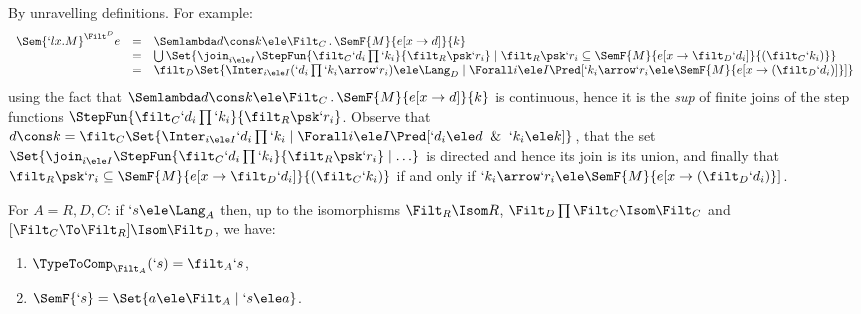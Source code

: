 \documentclass{lmcs}
\begin{document}
 \begin{Proof}
By unravelling definitions. For example:
%
%
 \[ \begin{array}[t]{rcl@{\quad}l}
\Sem{ `l x.M}^{\Filt^D }{ e }
	& = & \Semlambda d\cons k \ele \Filt_C \, . \, \SemF { M }{ e[x\to d] }{ k } \\
	& = & \bigcup \Set{ \join_{i \ele I}\StepFun{\filt_C `d_i\prod `k_i }{ \filt_R\psk `r_i} \mid \filt_R\psk `r_i \subseteq \SemF { M }{ e[x\to \filt_D `d_i] }{ (\filt_C `k_i) } } \\
	& = & \filt_D \Set{ \Inter_{i \ele I}(`d_i\prod `k_i\arrow `r_i) \ele \Lang_D \mid \Forall i \ele I \Pred[{ `k_i\arrow `r_i \ele \SemF { M }{ e[x\to (\filt_D `d_i)] } }] }
	\end{array} \]
using the fact that $ \Semlambda d\cons k \ele \Filt_C \, . \, \SemF { M }{ e[x\to d] }{ k }$ is continuous, hence it is the \emph{sup} of finite joins of the step functions 
$\StepFun{\filt_C `d_i\prod `k_i }{ \filt_R\psk `r_i} $.
Observe that $d\cons k = \filt_C \Set{\Inter_{i \ele I}`d_i\prod `k_i \mid \Forall i \ele I \Pred[ `d_i \ele d \And `k_i \ele k ] }$, that the set $\Set{\join_{i \ele I}\StepFun{\filt_C `d_i\prod `k_i }{ \filt_R\psk `r_i} \mid \ldots}$ is directed and hence its join is its union, and finally that $\filt_R\psk `r_i \subseteq \SemF { M }{ e[x\to \filt_D `d_i] }{ (\filt_C `k_i) }$ if and only if $`k_i\arrow `r_i \ele \SemF { M }{ e[x\to (\filt_D `d_i) } ]$.
 \end{Proof}

 \begin{lem} \label{lem:filtSemTypes}
For $A = R,D,C$: if $`s\ele \Lang_A$ then, up to the isomorphisms $\Filt_R\Isom R$, $\Filt_D\prod\Filt_C \Isom \Filt_C$ and
$[\Filt_C\To\Filt_R]\Isom \Filt_D$,
we have:
 \begin{enumerate}
 \item \label{lem:filtSemTypes-1}
	$\TypeToComp_{\Filt_A}(`s) = \filt_A `s$,
 \item \label{lem:filtSemTypes-2}
	$\SemF {`s} = \Set{a \ele \Filt_A \mid `s \ele a}$.
 \end{enumerate}
 \end{lem}
\end{document}
